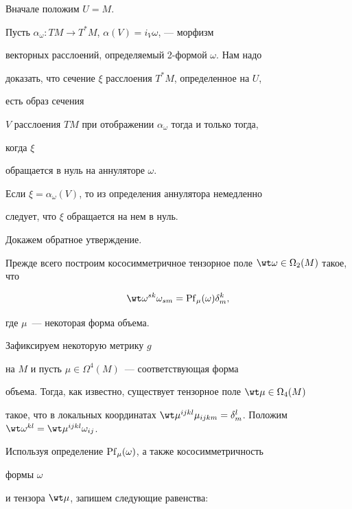\begin{pf}


Вначале положим $U = M$.


Пусть $\alpha_\omega : TM \to T^*M$, $\alpha(V) = i_V\omega$, --- морфизм


векторных расслоений, определяемый 2-формой $\omega$. Нам надо


доказать, что сечение $\xi$ расслоения $T^*M$, определенное на $U$,


есть образ сечения


$V$ расслоения $TM$ при отображении $\alpha_\omega$ тогда и только тогда,


когда $\xi$


обращается в нуль на аннуляторе $\omega$.





Если $\xi = \alpha_\omega(V)$, то из определения аннулятора немедленно


следует, что $\xi$ обращается на нем в нуль.





Докажем обратное утверждение.


Прежде всего построим кососимметричное тензорное поле $\wt\omega \in


\Omega_2(M)$ такое, что


\begin{equation}


 \label{eq12}


 \wt\omega{}^{sk}\omega_{sm} = \Pf_\mu(\omega)\delta^k_m,


\end{equation}


где $\mu$~--- некоторая форма объема.


Зафиксируем некоторую метрику $g$


на $M$ и пусть $\mu \in \Omega^4(M)$~--- соответствующая форма


объема. Тогда, как известно, существует тензорное поле $\wt\mu \in


\Omega_4(M)$


такое, что в локальных координатах $\wt\mu{}^{ijkl} \mu_{ijkm} =


\delta^l_m$. Положим $\wt\omega{}^{kl} = \wt\mu{}^{ijkl}\omega_{ij}$.


Используя определение $\operatorname{Pf}_\mu(\omega)$, а также кососимметричность


формы $\omega$


и тензора $\wt\mu$, запишем следующие равенства:



\end{pf}
